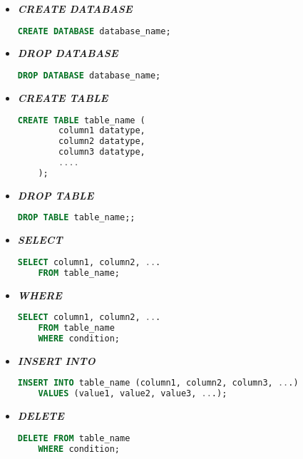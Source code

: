 \begin{itemize}
    \item \textbf{\textit{CREATE DATABASE}}
    \begin{lstlisting}[language=SQL]
    CREATE DATABASE database_name;
    \end{lstlisting}
    \newpage
    \item \textbf{\textit{DROP DATABASE}}
    \begin{lstlisting}[language=SQL]
    DROP DATABASE database_name;
    \end{lstlisting}
    
    \item \textbf{\textit{CREATE TABLE}}
    \begin{lstlisting}[language=SQL]
    CREATE TABLE table_name (
        column1 datatype,
        column2 datatype,
        column3 datatype,
        ....
    );
    \end{lstlisting}

    \item \textbf{\textit{DROP TABLE}}
    \begin{lstlisting}[language=SQL]
    DROP TABLE table_name;;
    \end{lstlisting}

    \item \textbf{\textit{SELECT}}
    \begin{lstlisting}[language=SQL]
    SELECT column1, column2, ...
    FROM table_name;
    \end{lstlisting}

    \item \textbf{\textit{WHERE}}
    \begin{lstlisting}[language=SQL]
    SELECT column1, column2, ...
    FROM table_name
    WHERE condition;
    \end{lstlisting}

    \item \textbf{\textit{INSERT INTO}}
    \begin{lstlisting}[language=SQL]
    INSERT INTO table_name (column1, column2, column3, ...)
    VALUES (value1, value2, value3, ...);
    \end{lstlisting}

    \item \textbf{\textit{DELETE}}
    \begin{lstlisting}[language=SQL]
    DELETE FROM table_name
    WHERE condition;
    \end{lstlisting}
\end{itemize}


